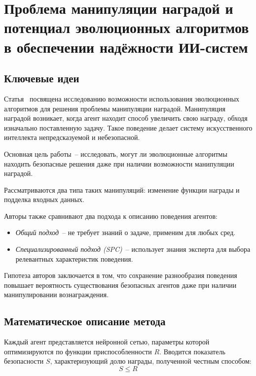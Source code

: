 \section{Проблема манипуляции наградой и потенциал эволюционных алгоритмов в обеспечении надёжности ИИ-систем}

\subsection{Ключевые идеи}

Статья~\cite{asmussen2023reward} посвящена исследованию возможности использования эволюционных алгоритмов для решения проблемы манипуляции наградой.  
Манипуляция наградой возникает, когда агент находит способ увеличить свою награду, обходя изначально поставленную задачу.  
Такое поведение делает систему искусственного интеллекта непредсказуемой и небезопасной.

Основная цель работы~-- исследовать, могут ли эволюционные алгоритмы находить безопасные решения даже при наличии возможности манипуляции наградой.  

Рассматриваются два типа таких манипуляций: изменение функции награды и подделка входных данных.  

Авторы также сравнивают два подхода к описанию поведения агентов:
\begin{itemize}
    \item \emph{Общий подход}~--  не требует знаний о задаче, применим для любых сред.
    \item \emph{Специализированный подход (SPC)}~-- использует знания эксперта для выбора релевантных характеристик поведения.
\end{itemize}

Гипотеза авторов заключается в том, что сохранение разнообразия поведения повышает вероятность существования безопасных агентов даже при наличии манипулировании вознаграждения.  

\subsection{Математическое описание метода}

Каждый агент представляется нейронной сетью, параметры которой оптимизируются по функции приспособленности $R$.  
Вводится показатель безопасности $S$, характеризующий долю награды, полученной честным способом:
\begin{equation}
S \leq R
\end{equation}

